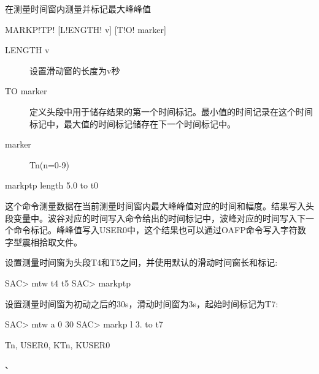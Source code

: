 \label{cmd:markptp}

在测量时间窗内测量并标记最大峰峰值

\begin{SACSTX}
MARKP!TP! [L!ENGTH! v] [T!O! marker]
\end{SACSTX}

\begin{description}
\item [LENGTH v] 设置滑动窗的长度为v秒 
\item [TO marker] 定义头段中用于储存结果的第一个时间标记。最小值的时间记录在这个时间标记中，最大值的时间标记储存在下一个时间标记中。 
\item [marker] Tn(n=0-9)
\end{description}

\begin{SACDFT}
markptp length 5.0 to t0
\end{SACDFT}

这个命令测量数据在当前测量时间窗内最大峰峰值对应的时间和幅度。结果写入头段变量中。波谷对应的时间写入命令给出的时间标记中，波峰对应的时间写入下一个命令标记。峰峰值写入USER0中，这个结果也可以通过OAFP命令写入字符数字型震相拾取文件。

设置测量时间窗为头段T4和T5之间，并使用默认的滑动时间窗长和标记:
\begin{SACCode}
SAC> mtw t4 t5
SAC> markptp
\end{SACCode}

设置测量时间窗为初动之后的30s，滑动时间窗为3s，起始时间标记为T7:
\begin{SACCode}
SAC> mtw a 0 30
SAC> markp l 3. to t7
\end{SACCode}

Tn, USER0, KTn, KUSER0

、
